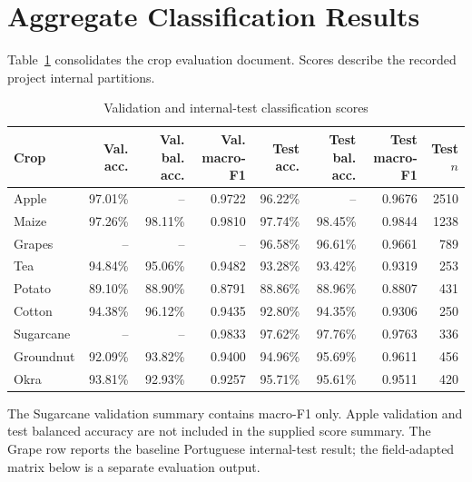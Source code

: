 \documentclass[12pt,a4paper,oneside]{report}
\begin{document}
\section{Aggregate Classification Results}
Table~\ref{tab:results} consolidates the crop evaluation document. Scores describe the recorded project internal partitions.
\begin{table}[H]\centering\small\caption{Validation and internal-test classification scores}\label{tab:results}\begin{tabularx}{\textwidth}{lrrrrrrr}\toprule Crop & Val. acc. & Val. bal. acc. & Val. macro-F1 & Test acc. & Test bal. acc. & Test macro-F1 & Test $n$\\\midrule
Apple&97.01\%&--&0.9722&96.22\%&--&0.9676&2510\\Maize&97.26\%&98.11\%&0.9810&97.74\%&98.45\%&0.9844&1238\\Grapes&--&--&--&96.58\%&96.61\%&0.9661&789\\Tea&94.84\%&95.06\%&0.9482&93.28\%&93.42\%&0.9319&253\\Potato&89.10\%&88.90\%&0.8791&88.86\%&88.96\%&0.8807&431\\Cotton&94.38\%&96.12\%&0.9435&92.80\%&94.35\%&0.9306&250\\Sugarcane&--&--&0.9833&97.62\%&97.76\%&0.9763&336\\Groundnut&92.09\%&93.82\%&0.9400&94.96\%&95.69\%&0.9611&456\\Okra&93.81\%&92.93\%&0.9257&95.71\%&95.61\%&0.9511&420\\\bottomrule\end{tabularx}\end{table}
The Sugarcane validation summary contains macro-F1 only. Apple validation and test balanced accuracy are not included in the supplied score summary. The Grape row reports the baseline Portuguese internal-test result; the field-adapted matrix below is a separate evaluation output.
\end{document}
